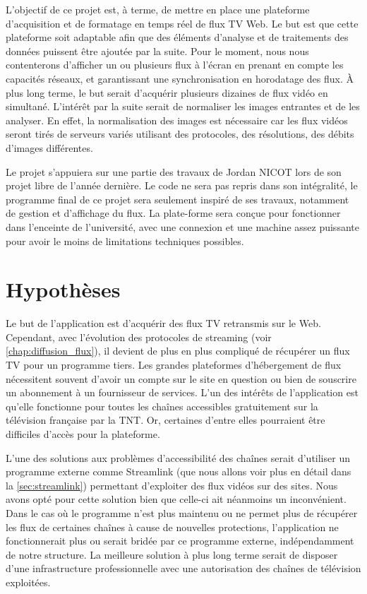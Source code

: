 \documentclass{polytech/polytech}
\begin{document}
L’objectif de ce projet est, à terme, de mettre en place une plateforme d’acquisition et de formatage en temps réel de flux TV Web. Le but est que cette plateforme soit adaptable afin que des éléments d’analyse et de traitements des données puissent être ajoutée par la suite. Pour le moment, nous nous contenterons d’afficher un ou plusieurs flux à l’écran en prenant en compte les capacités réseaux, et garantissant une synchronisation en horodatage des flux. À plus long terme, le but serait d'acquérir plusieurs dizaines de flux vidéo en simultané. L'intérêt par la suite serait de normaliser les images entrantes et de les analyser. En effet, la normalisation des images est nécessaire car les flux vidéos seront tirés de serveurs variés utilisant des protocoles, des résolutions, des débits d'images différentes. 

Le projet s’appuiera sur une partie des travaux de Jordan NICOT lors de son projet libre de l’année dernière. Le code ne sera pas repris dans son intégralité, le programme final de ce projet sera seulement inspiré de ses travaux, notamment de gestion et d’affichage du flux. La plate-forme sera conçue pour fonctionner dans l'enceinte de l'université, avec une connexion et une machine assez puissante pour avoir le moins de limitations techniques possibles.

\section{Hypothèses}

Le but de l’application est d’acquérir des flux TV retransmis sur le Web. Cependant, avec l’évolution des protocoles de streaming (voir \autoref{chap:diffusion_flux}), il devient de plus en plus compliqué de récupérer un flux TV pour un programme tiers. Les grandes plateformes d’hébergement de flux nécessitent souvent d’avoir un compte sur le site en question ou bien de souscrire un abonnement à un fournisseur de services. L’un des intérêts de l’application est qu’elle fonctionne pour toutes les chaînes accessibles gratuitement sur la télévision française par la TNT. Or, certaines d’entre elles pourraient être difficiles d’accès pour la plateforme.

L'une des solutions aux problèmes d'accessibilité des chaînes serait d'utiliser un programme externe comme Streamlink (que nous allons voir plus en détail dans la \autoref{sec:streamlink}) permettant d'exploiter des flux vidéos sur des sites. Nous avons opté pour cette solution bien que celle-ci ait néanmoins un inconvénient. Dans le cas où le programme n'est plus maintenu ou ne permet plus de récupérer les flux de certaines chaînes à cause de nouvelles protections, l'application ne fonctionnerait plus ou serait bridée par ce programme externe, indépendamment de notre structure. La meilleure solution à plus long terme serait de disposer d'une infrastructure professionnelle avec une autorisation des chaînes de télévision exploitées.
\end{document}
